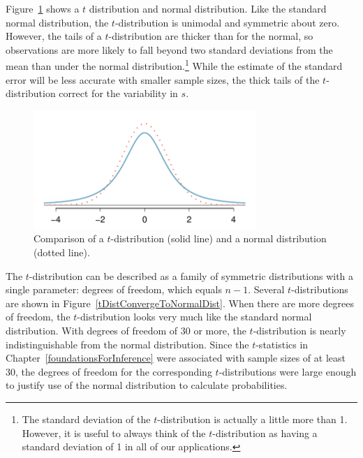 
Figure~\ref{tDistCompareToNormalDist} shows a $t$ distribution and normal distribution. Like the standard normal distribution, the $t$-distribution is unimodal and symmetric about zero.  However, the tails of a $t$-distribution are thicker than for the normal, so observations are more likely to fall beyond two standard deviations from the mean than under the normal distribution.\footnote{The standard deviation of the $t$-distribution is actually a little more than 1. However, it is useful to always think of the $t$-distribution as having a standard deviation of 1 in all of our applications.} While the estimate of the standard error will be less accurate with smaller sample sizes, the thick tails of the $t$-distribution correct for the variability in $s$.

\begin{figure}
\centering
\includegraphics[height=45mm]{ch_inference_for_means_oi_biostat/figures/tDistCompareToNormalDist/tDistCompareToNormalDist}
\caption{Comparison of a $t$-distribution (solid line) and a normal distribution (dotted line).}
\label{tDistCompareToNormalDist}
\end{figure}

The $t$-distribution can be described as a family of symmetric distributions with a single parameter: degrees of freedom, which equals $n - 1$. Several $t$-distributions are shown in Figure~\ref{tDistConvergeToNormalDist}. When there are more degrees of freedom, the $t$-distribution looks very much like the standard normal distribution. With degrees of freedom of 30 or more, the $t$-distribution is nearly indistinguishable from the normal distribution. Since the $t$-statistics in Chapter~\ref{foundationsForInference} were associated with sample sizes of at least 30, the degrees of freedom for the corresponding $t$-distributions were large enough to justify use of the normal distribution to calculate probabilities. 


